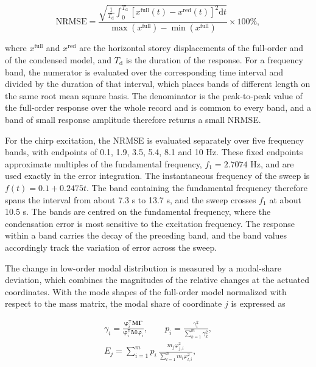 \documentclass[a4paper,fleqn,review,12pt]{cas-sc}
\begin{document}
\vspace{-3.5em}
\begin{equation}
	\mathrm{NRMSE}=
	\frac{\displaystyle\sqrt{\frac{1}{T_{\mathrm{d}}}\int_{0}^{T_{\mathrm{d}}}
			\left[x^{\mathrm{full}}(t)-x^{\mathrm{red}}(t)\right]^{2}\mathrm{d}t}}
	{\max\left(x^{\mathrm{full}}\right)-\min\left(x^{\mathrm{full}}\right)}
	\times100\%,
	\label{eq:nrmse}
\end{equation}
\vspace{-3.5em}

\noindent where \(x^{\mathrm{full}}\) and \(x^{\mathrm{red}}\) are the horizontal storey displacements of the full-order and of the condensed model, and \(T_{\mathrm{d}}\) is the duration of the response. For a frequency band, the numerator is evaluated over the corresponding time interval and divided by the duration of that interval, which places bands of different length on the same root mean square basis. The denominator is the peak-to-peak value of the full-order response over the whole record and is common to every band, and a band of small response amplitude therefore returns a small NRMSE.

For the chirp excitation, the NRMSE is evaluated separately over five frequency bands, with endpoints of 0.1, 1.9, 3.5, 5.4, 8.1 and 10 Hz. These fixed endpoints approximate multiples of the fundamental frequency, \(f_1=2.7074\) Hz, and are used exactly in the error integration. The instantaneous frequency of the sweep is \(f(t)=0.1+0.2475t\). The band containing the fundamental frequency therefore spans the interval from about 7.3 s to 13.7 s, and the sweep crosses \(f_{1}\) at about 10.5 s. The bands are centred on the fundamental frequency, where the condensation error is most sensitive to the excitation frequency. The response within a band carries the decay of the preceding band, and the band values accordingly track the variation of error across the sweep.

The change in low-order modal distribution is measured by a modal-share deviation, which combines the magnitudes of the relative changes at the actuated coordinates. With the mode shapes of the full-order model normalized with respect to the mass matrix, the modal share of coordinate \(j\) is expressed as

\vspace{-3.5em}
\begin{equation}
	\begin{gathered}
		\gamma_{i}=
		\frac{\bm{\varphi}_{i}^{\mathsf{T}}\mathbf{M}\bm{\Gamma}}
		{\bm{\varphi}_{i}^{\mathsf{T}}\mathbf{M}\bm{\varphi}_{i}},
		\qquad
		p_{i}=\frac{\gamma_{i}^{2}}{\displaystyle\sum_{k=1}^{m}\gamma_{k}^{2}},\\[2pt]
		E_{j}=\sum_{i=1}^{m}p_{i}\,
		\frac{m_{j}\varphi_{j,i}^{2}}{\displaystyle\sum_{l=1}^{n}m_{l}\varphi_{l,i}^{2}},
	\end{gathered}
	\label{eq:dof-energy}
\end{equation}
\vspace{-2.5em}
\end{document}
